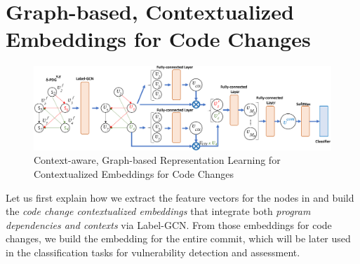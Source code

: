 
\section{Graph-based, Contextualized Embeddings for Code Changes}
\label{embedding:sec}

\begin{figure}[t]
	\centering
	\includegraphics[width=5.9in]{graphs/model-6.png}
	\vspace{-12pt}
	\caption{Context-aware, Graph-based Representation Learning for Contextualized Embeddings for Code Changes}
	\label{fig:step-2}
\end{figure}


Let us first explain how we extract the feature vectors for the nodes
in {\mvpdgxy} and build the {\em code change contextualized
  embeddings} that integrate both {\em program dependencies and
  contexts} via Label-GCN. From those embeddings for code changes,
we build the embedding for the entire commit, which will be later used
in the classification tasks for vulnerability detection and assessment.




